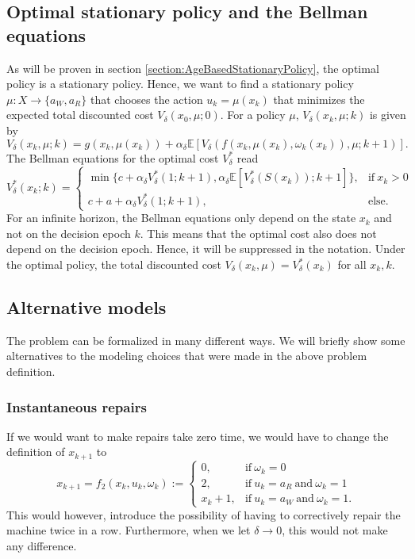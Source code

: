 \subsection{Optimal stationary policy and the Bellman equations}
As will be proven in section \ref{section:AgeBasedStationaryPolicy}, the optimal policy is a stationary policy.
Hence, we want to find a stationary policy $\mu:X\rightarrow \{a_W,a_R\}$ that chooses the action $u_k=\mu(x_k)$ that minimizes the expected total discounted cost $V_\delta(x_0,\mu;0)$.
For a policy $\mu$, $V_\delta(x_k,\mu;k)$ is given by
$$
V_\delta(x_k,\mu;k)=g(x_k,\mu(x_k))+\alpha_\delta \mathbb{E}[V_\delta(f(x_k,\mu(x_k),\omega_k(x_k)),\mu;k+1)].
$$
The Bellman equations for the optimal cost $V^*_\delta$ read
\begin{equation}\label{eq:AgeBasedBellman}
V^*_\delta(x_k;k)=\begin{cases}
\min\{c+\alpha_\delta V^*_\delta(1;k+1),\alpha_\delta \mathbb{E}[V^*_\delta(S(x_k));k+1]\},&\text{if}\ x_k>0 \\
c+a+\alpha_\delta V^*_\delta(1;k+1),&\text{else.}
\end{cases}
\end{equation}
For an infinite horizon, the Bellman equations only depend on the state $x_k$ and not on the decision epoch $k$.
This means that the optimal cost also does not depend on the decision epoch.
Hence, it will be suppressed in the notation.
Under the optimal policy, the total discounted cost $V_\delta(x_k,\mu)=V^*_\delta(x_k)$ for all $x_k,k$.

\subsection{Alternative models}
The problem can be formalized in many different ways.
We will briefly show some alternatives to the modeling choices that were made in the above problem definition.
\subsubsection{Instantaneous repairs}
If we would want to make repairs take zero time, we would have to change the definition of $x_{k+1}$ to 
$$
x_{k+1}=f_2(x_k,u_k,\omega_k):=\begin{cases}
0,&\text{if}\ \omega_k=0 \\
2,&\text{if}\ u_k=a_R\ \text{and}\ \omega_k=1\\
x_k+1,&\text{if}\ u_k=a_W\ \text{and}\ \omega_k=1.
\end{cases}
$$
This would however, introduce the possibility of having to correctively repair the machine twice in a row.
Furthermore, when we let $\delta\rightarrow 0$, this would not make any difference.

